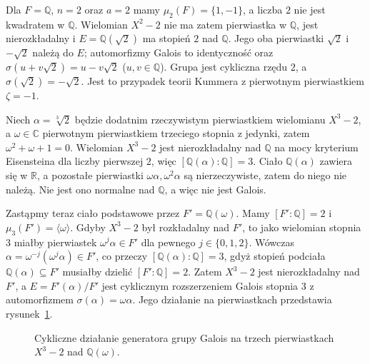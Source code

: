 \begin{przyklad}\label{aa:prz:kummer-square}
Dla $F=\mathbb Q$, $n=2$ oraz $a=2$ mamy
$\mu_2(F)=\{1,-1\}$, a liczba $2$ nie jest kwadratem
w $\mathbb Q$. Wielomian $X^2-2$ nie ma zatem pierwiastka
w $\mathbb Q$, jest nierozkładalny i
$E=\mathbb Q(\sqrt2)$ ma stopień $2$ nad $\mathbb Q$.
Jego oba pierwiastki $\sqrt2$ i $-\sqrt2$ należą do $E$;
automorfizmy Galois to identyczność oraz
$\sigma(u+v\sqrt2)=u-v\sqrt2$ ($u,v\in\mathbb Q$).
Grupa jest cykliczna rzędu $2$, a $\sigma(\sqrt2)=-\sqrt2$.
Jest to przypadek teorii Kummera z pierwotnym pierwiastkiem
$\zeta=-1$.
\end{przyklad}

\begin{przyklad}\label{aa:prz:kummer-missing-roots}
Niech $\alpha=\sqrt[3]{2}$ będzie dodatnim rzeczywistym
pierwiastkiem wielomianu $X^3-2$, a
$\omega\in\mathbb C$ pierwotnym pierwiastkiem trzeciego stopnia
z jedynki, zatem $\omega^2+\omega+1=0$.
Wielomian $X^3-2$ jest nierozkładalny nad $\mathbb Q$
na mocy kryterium Eisensteina dla liczby pierwszej $2$,
więc $[\mathbb Q(\alpha):\mathbb Q]=3$.
Ciało $\mathbb Q(\alpha)$ zawiera się w $\mathbb R$,
a pozostałe pierwiastki $\omega\alpha,\omega^2\alpha$
są nierzeczywiste, zatem do niego nie należą.
Nie jest ono normalne nad $\mathbb Q$, a więc nie jest Galois.

Zastąpmy teraz ciało podstawowe przez $F'=\mathbb Q(\omega)$.
Mamy $[F':\mathbb Q]=2$ i $\mu_3(F')=\langle\omega\rangle$.
Gdyby $X^3-2$ był rozkładalny nad $F'$, to jako wielomian
stopnia $3$ miałby pierwiastek $\omega^j\alpha\in F'$
dla pewnego $j\in\{0,1,2\}$. Wówczas
$\alpha=\omega^{-j}(\omega^j\alpha)\in F'$, co przeczy
$[\mathbb Q(\alpha):\mathbb Q]=3$, gdyż stopień podciała
$\mathbb Q(\alpha)\subseteq F'$ musiałby dzielić
$[F':\mathbb Q]=2$.
Zatem $X^3-2$ jest nierozkładalny nad $F'$, a
$E=F'(\alpha)/F'$ jest cyklicznym rozszerzeniem Galois
stopnia $3$ z automorfizmem $\sigma(\alpha)=\omega\alpha$.
Jego działanie na pierwiastkach przedstawia
rysunek~\ref{aa:fig:kummer-cubic-cycle}.
\end{przyklad}
\begin{figure}[htbp]
\centering
{}
\caption{Cykliczne działanie generatora grupy Galois na trzech pierwiastkach $X^3-2$ nad $\mathbb Q(\omega)$.}
\label{aa:fig:kummer-cubic-cycle}
\end{figure}

